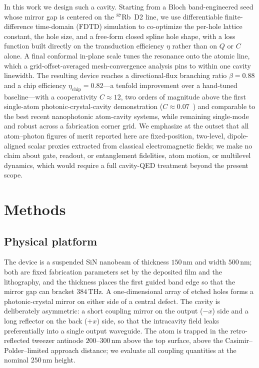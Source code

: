 \documentclass[%
 reprint,
 amsmath,amssymb,
 aps,prx,
 superscriptaddress,
]{revtex4-2}
\newcommand{\unit}[1]{\,\mathrm{#1}}
\begin{document}
In this work we design such a cavity. Starting from a Bloch band-engineered seed
whose mirror gap is centered on the $^{87}$Rb~D2 line, we use differentiable
finite-difference time-domain (FDTD) simulation to co-optimize the per-hole
lattice constant, the hole size, and a free-form closed spline hole shape, with a
loss function built directly on the transduction efficiency $\eta$ rather than on
$Q$ or $C$ alone. A final conformal in-plane scale tunes the resonance onto the
atomic line, which a grid-offset-averaged mesh-convergence analysis pins to within
one cavity linewidth. The resulting device reaches a directional-flux branching
ratio $\beta=0.88$ and a chip efficiency $\eta_\mathrm{chip}=0.82$---a tenfold
improvement over a hand-tuned baseline---with a cooperativity $C\approx12$, two
orders of magnitude above the first single-atom photonic-crystal-cavity
demonstration ($C\approx0.07$~\cite{thompson2013}) and comparable to the best
recent nanophotonic atom-cavity systems, while remaining single-mode and robust
across a fabrication corner grid. We emphasize at the outset that all atom--photon
figures of merit reported here are fixed-position, two-level, dipole-aligned
scalar proxies extracted from classical electromagnetic fields; we make no claim
about gate, readout, or entanglement fidelities, atom motion, or multilevel
dynamics, which would require a full cavity-QED treatment beyond the present scope.

\section{Methods}

\subsection{Physical platform}

The device is a suspended SiN nanobeam of thickness $150\unit{nm}$ and width
$500\unit{nm}$; both are fixed fabrication parameters set by the deposited film
and the lithography, and the thickness places the first guided band edge so that
the mirror gap can bracket $384\unit{THz}$. A one-dimensional array of etched
holes forms a photonic-crystal mirror on either side of a central defect. The
cavity is deliberately asymmetric: a short coupling mirror on the output ($-x$)
side and a long reflector on the back ($+x$) side, so that the intracavity field
leaks preferentially into a single output waveguide. The atom is trapped in the
retro-reflected tweezer antinode $200$--$300\unit{nm}$ above the top surface,
above the Casimir--Polder--limited approach distance; we evaluate all coupling
quantities at the nominal $250\unit{nm}$ height.
\end{document}
